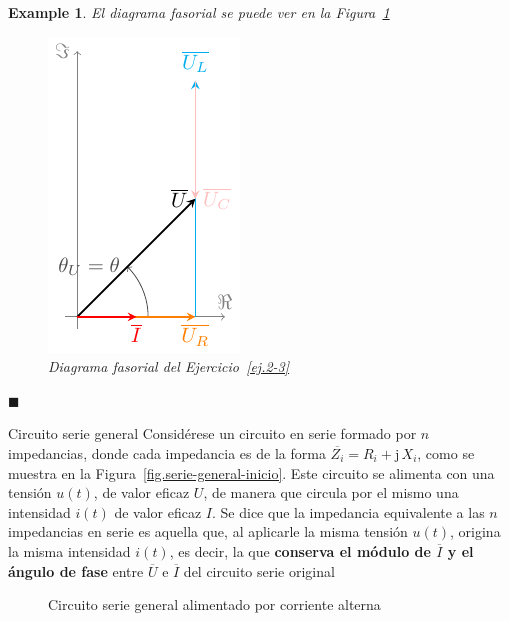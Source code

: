 \documentclass[11pt]{book} %
\makeatletter
\numberwithin{dummy}{section}
\theoremstyle{ocrenumbox}
\theoremstyle{blacknumex}
\newtheorem{exampleT}{Example}[chapter]
\theoremstyle{blacknumbox}
\theoremstyle{ocrenum}
\newenvironment{example}{\begin{exampleT}}{\hfill{\tiny\ensuremath{\blacksquare}}\end{exampleT}}
\renewcommand{\subsection}{\@startsection {subsection}{2}{\z@}
{-3ex \@plus -0.1ex \@minus -.4ex}
{0.5ex \@plus.2ex }
{\normalfont\sffamily\bfseries}}
\makeatother
\begin{document}
\begin{example}
		El diagrama fasorial se puede ver en la Figura~\ref{fig.diagrama_fasorial_ejemplo2-3}
		\begin{figure}[h]
			\centering
			\includegraphics{../figs/diagrama_fasorial_ejemplo2_3.pdf}
			\caption{Diagrama fasorial del Ejercicio~\ref{ej.2-3}}
			\label{fig.diagrama_fasorial_ejemplo2-3}
		\end{figure}
		
		
		
		
	\end{example}
	
	\subsection{Circuito serie general}
	Considérese un circuito en serie formado por $n$ impedancias, donde cada impedancia es de la forma $\overline{Z_i}=R_i+\mathrm{j}\,X_i$, como se muestra en la Figura~\ref{fig.serie-general-inicio}. Este circuito se alimenta con una tensión $u(t)$, de valor eficaz $U$, de manera que circula por el mismo una intensidad $i(t)$ de valor eficaz $I$. Se dice que la impedancia equivalente a las $n$ impedancias en serie es aquella que, al aplicarle la misma tensión $u(t)$, origina la misma intensidad $i(t)$, es decir, la que \textbf{conserva el módulo de $\overline{I}$ y el ángulo de fase} entre $\overline{U}$ e $\overline{I}$ del circuito serie original
	\begin{figure}[htbp]
		\centering
		\hfil
		\caption{Circuito serie general alimentado por corriente alterna}
		\label{fig.serie-general}
	\end{figure}
	
\end{document}
